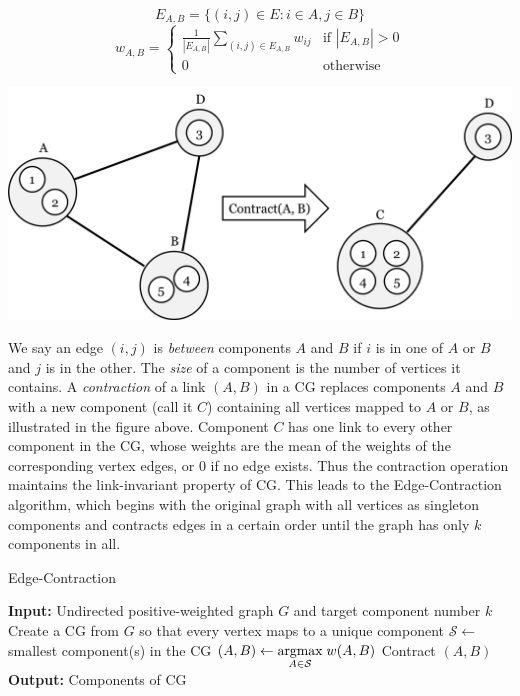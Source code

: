 \[ E_{A,B} = \{(i, j) \in E : i \in A, j \in B\} \]
\[ w_{A,B} = \begin{cases}
    \frac{1}{|E_{A,B}|} \sum_{(i,j) \in E_{A,B}} w_{ij} &
        \text{if } |E_{A,B}| > 0 \\
    0 & \text{otherwise}
\end{cases} \]

\includegraphics[scale = 0.55]{figs/4_contractible_graph}

We say an edge $(i,j)$ is \textit{between} components $A$ and $B$ if
$i$ is in one of $A$ or $B$ and $j$ is in the other. The \textit{size}
of a component is the number of vertices it contains.
A \textit{contraction} of a link $(A,B)$ in a CG replaces components
$A$ and $B$ with a new component (call it $C$) containing all vertices
mapped to $A$ or $B$, as illustrated in the figure above.
Component $C$ has one link to every other component in the CG, whose
weights are the mean of the weights of the corresponding vertex edges,
or $0$ if no edge exists. Thus the contraction operation maintains the
link-invariant property of CG. This leads to the Edge-Contraction
algorithm, which begins with the original graph with all vertices as
singleton components and contracts edges in a certain order until the
graph has only $k$ components in all.

\begin{algorithm}
\caption{Edge-Contraction}
\begin{algorithmic}
\State \textbf{Input:} Undirected positive-weighted graph $G$ and
       target component number $k$
\State Create a CG from $G$ so that every vertex maps to
       a unique component
\Repeat
\State $\mathcal{S} \gets$ smallest component(s) in the CG
\State $(A,B) \gets \underset{A \in \mathcal{S}}{\mathrm{arg max}}\; w(A,B)$
\State Contract $(A,B)$
\State \textbf{Output:} Components of CG
\end{algorithmic}
\end{algorithm}

